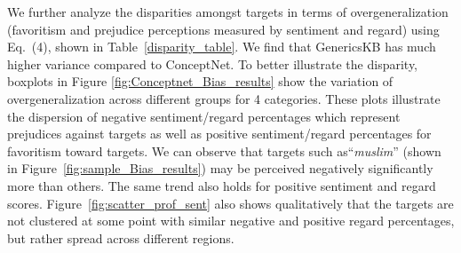 
We further analyze the disparities amongst targets in terms of overgeneralization (favoritism and prejudice perceptions measured by sentiment and regard) using Eq.~(4), shown in Table~\ref{disparity_table}. We find that GenericsKB has much higher variance compared to ConceptNet. To better illustrate the disparity, boxplots in Figure \ref{fig:Conceptnet_Bias_results} show the variation of overgeneralization across different groups for 4 categories.
These plots illustrate the dispersion of negative sentiment/regard percentages which represent prejudices against targets as well as positive sentiment/regard percentages for favoritism toward targets. We can observe that targets such as``\emph{muslim}'' (shown in Figure~\ref{fig:sample_Bias_results}) may be perceived negatively significantly more than others. The same trend also holds for positive sentiment and regard scores. Figure~\ref{fig:scatter_prof_sent} also shows qualitatively that the targets are not clustered at some point with similar negative and positive regard percentages, but rather spread across different regions.
\begin{table}[t]
\centering
{}
\caption{Disparity results quantified by \emph{variance} across all targets on two CSKBs as shown in Equations~\ref{eq:3} (statement \#) and~\ref{eq:4}.}
\label{disparity_table}

\end{table}

